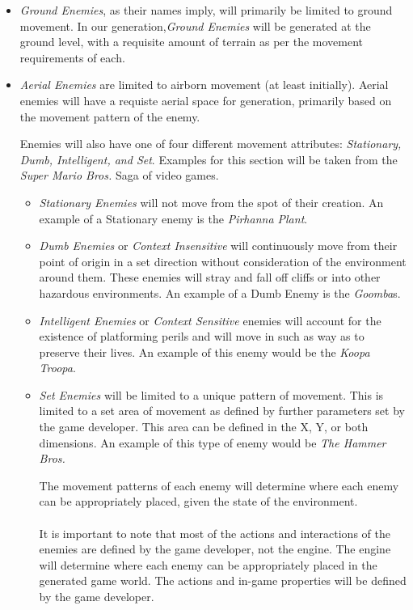 \documentclass[pdftex,12pt,letter]{article}
\begin{document}
\begin{itemize}

\item \textit{Ground Enemies}, as their names imply, will primarily be limited to ground movement. In our generation,\textit{Ground Enemies} will be generated at the ground level, with a requisite amount of terrain as per the movement requirements of each. 

\item \textit{Aerial Enemies} are limited to airborn movement (at least initially). Aerial enemies will have a requiste aerial space for generation, primarily based on the movement pattern of the enemy. \\

\endgroup


Enemies will also have one of four different movement attributes: \textit{Stationary, Dumb, Intelligent, and Set}. Examples for this section will be taken from the \textit{Super Mario Bros.} Saga of video games. 
\begin{itemize}

\item \textit{Stationary Enemies} will not move from the spot of their creation. An example of a Stationary enemy is the \textit{Pirhanna Plant}.

\item \textit{Dumb Enemies} or \textit{Context Insensitive} will continuously move from their point of origin in a set direction without consideration of the environment around them. These enemies will stray and fall off cliffs or into other hazardous environments. An example of a Dumb Enemy is the \textit{Goomba}s.

\item \textit{Intelligent Enemies} or \textit{Context Sensitive} enemies will account for the existence of platforming perils and will move in such as way as to preserve their lives. An example of this enemy would be the \textit{Koopa Troopa}.

\item \textit{Set Enemies} will be limited to a unique pattern of movement. This is limited to a set area of movement as defined by further parameters set by the game developer. This area can be defined in the X, Y, or both dimensions. An example of this type of enemy would be \textit{The Hammer Bros.}\\

\endgroup

The movement patterns of each enemy will determine where each enemy can be appropriately placed, given the state of the environment. 
\\\\
It is important to note that most of the actions and interactions of the enemies are defined by the game developer, not the engine. The engine will determine where each enemy can be appropriately placed in the generated game world. The actions and in-game properties will be defined by the game developer.
\\


\end{itemize}
\end{itemize}
\end{document}

